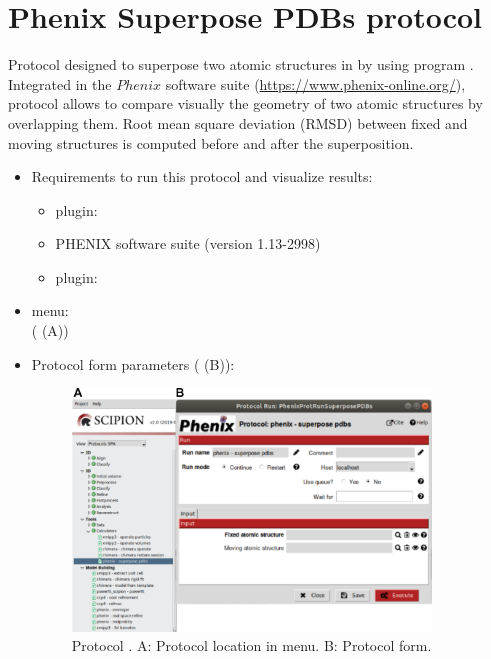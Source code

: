 \section{Phenix Superpose PDBs protocol}
\label{app:superposePdbsProtocol}%
Protocol designed to superpose two atomic structures in \scipion by using  program \citep{zwartUrl}. Integrated in the $Phenix$ software suite (\url{https://www.phenix-online.org/}), \phenix protocol  allows to compare visually the geometry of two atomic structures by overlapping them. Root mean square deviation (RMSD) between fixed and moving structures is computed before and after the superposition. 

\begin{itemize}
 \item Requirements to run this protocol and visualize results:
    \begin{itemize}
        \item \scipion plugin: 
        \item PHENIX software suite (version 1.13-2998)
        \item \scipion plugin: 
    \end{itemize}
 \item \scipion menu:\\
   ( (A))
  
 \item Protocol form parameters ( (B)):
 
 \begin{figure}[H]
     \centering 
     \captionsetup{width=.7\linewidth} 
     \includegraphics[width=0.90\textwidth]{Images_appendix/Fig153.pdf}
     \caption{Protocol . A: Protocol location in \scipion menu. B: Protocol form.}
     \label{fig:app_protocol_superpose_pdbs_1}
    \end{figure}
    

\end{itemize}
